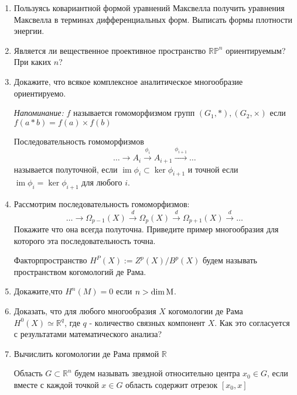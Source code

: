 \documentclass{article}
\DeclareMathOperator{\im}{im}
\begin{document}
 	\begin{enumerate}
 		\item Пользуясь ковариантной формой уравнений Максвелла получить уравнения Максвелла в терминах дифференциальных форм. Выписать формы плотности энергии.
 		\item Является ли вещественное проективное пространство $\mathbb{RP}^n$ ориентируемым? При каких $n$?
 		\item Докажите, что всякое комплексное аналитическое многообразие ориентируемо.
 		
 		\vspace{3ex}
 		\textit{Напоминание:} $f$ называется гомоморфизмом групп $(G_1,*),  (G_2, \times )$ если $f(a*b)= f(a) \times f(b)$
 		
 		\vspace{2ex}
 		Последовательность гомоморфизмов
 		$$
 		\dots \longrightarrow A_i \stackrel{\phi_i} {\longrightarrow} A_{i+1} \stackrel{\phi_{i+1}}{\longrightarrow} \dots
 		$$ называется полуточной, если $\im \phi_i \subset \ker \phi_{i+1}$ и точной если $\im \phi_i = \ker \phi_{i+1}$ для любого $i$.
 		
 		\item Рассмотрим последовательность гомоморфизмов:
 		$$
 		\dots \longrightarrow \Omega_{p-1} (X) \stackrel{d} {\longrightarrow} \Omega_p(X)  \stackrel{d}{\longrightarrow} \Omega_{p+1} (X) \stackrel{d}{\longrightarrow} \dots
 		$$
 		Покажите что она всегда полуточна. Приведите пример многообразия для которого эта последовательность точна.
 		
 		\vspace{3ex}
 		Факторпространство $H^P(X) := Z^p(X) / B^p (X)$
 		будем называть пространством когомологий де Рама.
 		\item Докажите,что $H^n (M) = 0$ если $n > \dim \text M$.
 		\item Доказать, что для любого многообразия $X$ когомологии де Рама $H^0(X)\simeq \mathbb{R}^q$, где $q$ - количество связных компонент $X$. Как это согласуется с результатами математического анализа?
 		\item Вычислить когомологии де Рама прямой $\mathbb{R}$
 		
 		\vspace{3ex}
 		Область $G \subset \mathbb{R}^n$ будем называть звездной относительно центра $x_0 \in G$, если вместе с каждой точкой $x \in G$ область содержит отрезок $[x_0, x]$
 		

\end{enumerate}
\end{document}
